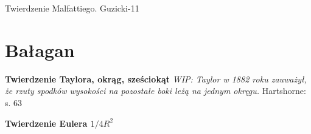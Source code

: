
Twierdzenie Malfattiego.
Guzicki-11

\section{Bałagan}

\textbf{Twierdzenie Taylora, okrąg, sześciokąt}
{
    \emph{WIP: Taylor w 1882 roku zauważył, że rzuty spodków wysokości na pozostałe boki leżą na jednym okręgu.}
	Hartshorne: s. 63
}

\textbf{Twierdzenie Eulera $1/4R^2$}



%
